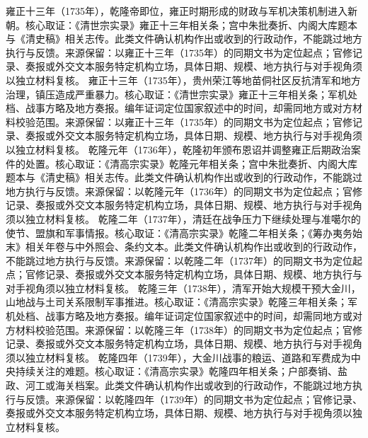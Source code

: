 雍正十三年（1735年），乾隆帝即位，雍正时期形成的财政与军机决策机制进入新朝。核心取证：《清世宗实录》雍正十三年相关条；宫中朱批奏折、内阁大库题本与《清史稿》相关志传。此类文件确认机构作出或收到的行政动作，不能跳过地方执行与反馈。来源保留：以雍正十三年（1735年）的同期文书为定位起点；官修记录、奏报或外交文本服务特定机构立场，具体日期、规模、地方执行与对手视角须以独立材料复核。
雍正十三年（1735年），贵州荣江等地苗侗社区反抗清军和地方治理，镇压造成严重暴力。核心取证：《清世宗实录》雍正十三年相关条；军机处档、战事方略及地方奏报。编年证词定位国家叙述中的时间，却需同地方或对方材料校验范围。来源保留：以雍正十三年（1735年）的同期文书为定位起点；官修记录、奏报或外交文本服务特定机构立场，具体日期、规模、地方执行与对手视角须以独立材料复核。
乾隆元年（1736年），乾隆初年颁布恩诏并调整雍正后期政治案件的处置。核心取证：《清高宗实录》乾隆元年相关条；宫中朱批奏折、内阁大库题本与《清史稿》相关志传。此类文件确认机构作出或收到的行政动作，不能跳过地方执行与反馈。来源保留：以乾隆元年（1736年）的同期文书为定位起点；官修记录、奏报或外交文本服务特定机构立场，具体日期、规模、地方执行与对手视角须以独立材料复核。
乾隆二年（1737年），清廷在战争压力下继续处理与准噶尔的使节、盟旗和军事情报。核心取证：《清高宗实录》乾隆二年相关条；《筹办夷务始末》相关年卷与中外照会、条约文本。此类文件确认机构作出或收到的行政动作，不能跳过地方执行与反馈。来源保留：以乾隆二年（1737年）的同期文书为定位起点；官修记录、奏报或外交文本服务特定机构立场，具体日期、规模、地方执行与对手视角须以独立材料复核。
乾隆三年（1738年），清军开始大规模干预大金川，山地战与土司关系限制军事推进。核心取证：《清高宗实录》乾隆三年相关条；军机处档、战事方略及地方奏报。编年证词定位国家叙述中的时间，却需同地方或对方材料校验范围。来源保留：以乾隆三年（1738年）的同期文书为定位起点；官修记录、奏报或外交文本服务特定机构立场，具体日期、规模、地方执行与对手视角须以独立材料复核。
乾隆四年（1739年），大金川战事的粮运、道路和军费成为中央持续关注的难题。核心取证：《清高宗实录》乾隆四年相关条；户部奏销、盐政、河工或海关档案。此类文件确认机构作出或收到的行政动作，不能跳过地方执行与反馈。来源保留：以乾隆四年（1739年）的同期文书为定位起点；官修记录、奏报或外交文本服务特定机构立场，具体日期、规模、地方执行与对手视角须以独立材料复核。
